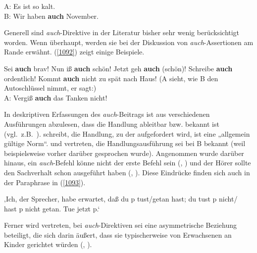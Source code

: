 \begin{exe}
	\ex\label{1091} 
	A: Es ist so kalt.\\
	B: Wir haben \textbf{auch} November.				     
\end{exe}	
Generell sind \textit{auch}-Direktive in der Literatur bisher sehr wenig berücksichtigt worden. Wenn überhaupt, werden sie bei der Diskussion von \textit{auch}-Assertionen am Rande erwähnt. (\ref{1092}) zeigt einige Beispiele.

\begin{exe}
	\ex\label{1092} 
		\begin{xlist}	
			\ex\label{1092a} Sei \textbf{auch} brav!	
			\hfill\hbox{\citet[97]{Diewald1998}}
			\ex\label{1092b} Nun iß \textbf{auch} schön!
			\hfill\hbox{\citet[158]{Thurmair1989}}
			\ex\label{1092c} Jetzt geh \textbf{auch} (schön)!	
			\hfill\hbox{\citet[60]{Dittmann1980}}
			\ex\label{1092d} Schreibe \textbf{auch} ordentlich!		
			\hfill\hbox{\citet[90]{Helbig1990}}
			\ex\label{1092e} Kommt \textbf{auch} nicht zu spät nach Haus!		
			\hfill\hbox{\citet[58]{Dahl1988}}
			\ex\label{1092f} (A sieht, wie B den Autoschlüssel nimmt, er sagt:)\\
			A: Vergiß \textbf{auch} das Tanken nicht!		
			\hfill\hbox{\citet[50]{Dahl1988}}
		\end{xlist}
\end{exe}
In deskriptiven Erfassungen des \textit{auch}-Beitrags ist aus verschiedenen Ausführungen abzulesen, dass die Handlung ableitbar bzw. bekannt ist (vgl.\ z.B.\ \citealt[109]{Burkhardt1982}). \citet[158]{Thurmair1989} schreibt, die Handlung, zu der aufgefordert wird, ist eine „allgemein gültige Norm“. \citet[50]{Dahl1988} und \citet[78]{Kwon2005} vertreten, die Handlungsausführung sei bei B bekannt (weil beispielsweise vorher darüber gesprochen wurde). Angenommen wurde darüber hinaus, ein \textit{auch}-Befehl könne nicht der erste Befehl sein (\citealt[50]{Dahl1988}, \citealt[78]{Kwon2005}) und der Hörer sollte den Sachverhalt schon ausgeführt haben (\citealt[90]{Helbig1990}, \citealt[215]{Kwon2005}). Diese Eindrücke finden sich auch in der Paraphrase in (\ref{1093}).

\begin{exe}
	\ex\label{1093} 
	‚Ich, der Sprecher, habe erwartet, daß du p tust/getan hast; du tust p nicht/\\hast p nicht getan. Tue jetzt p.‘ 	
	\hfill\hbox{\citet[60]{Dittmann1980}}
\end{exe}
Ferner wird vertreten, bei \textit{auch}-Direktiven sei eine asymmetrische Beziehung beteiligt, die sich darin äußert, dass sie typischerweise von Erwachsenen an Kinder gerichtet würden (\citealt[158]{Thurmair1989}, \citealt[78]{Kwon2005}). 

